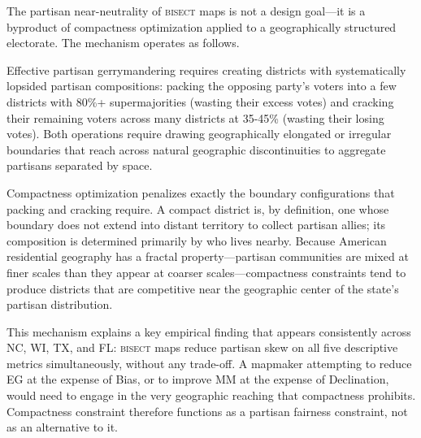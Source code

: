 The partisan near-neutrality of \textsc{bisect} maps is not a design goal---it
is a byproduct of compactness optimization applied to a geographically structured
electorate. The mechanism operates as follows.

Effective partisan gerrymandering requires creating districts with systematically
lopsided partisan compositions: packing the opposing party's voters into a few
districts with 80\%+ supermajorities (wasting their excess votes) and cracking
their remaining voters across many districts at 35-45\% (wasting their losing
votes). Both operations require drawing geographically elongated or irregular
boundaries that reach across natural geographic discontinuities to aggregate
partisans separated by space.

Compactness optimization penalizes exactly the boundary configurations that
packing and cracking require. A compact district is, by definition, one whose
boundary does not extend into distant territory to collect partisan allies;
its composition is determined primarily by who lives nearby. Because American
residential geography has a fractal property---partisan communities are mixed
at finer scales than they appear at coarser scales---compactness constraints
tend to produce districts that are competitive near the geographic center of
the state's partisan distribution.

This mechanism explains a key empirical finding that appears consistently across
NC, WI, TX, and FL: \textsc{bisect} maps reduce partisan skew on all five
descriptive metrics simultaneously, without any trade-off. A mapmaker attempting
to reduce EG at the expense of Bias, or to improve MM at the expense of
Declination, would need to engage in the very geographic reaching that
compactness prohibits. Compactness constraint therefore functions as a partisan
fairness constraint, not as an alternative to it.

